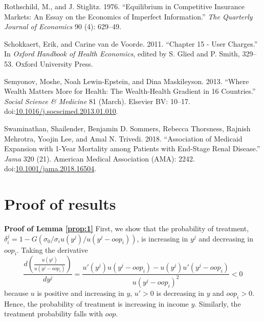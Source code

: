 \documentclass[a4paper,12pt]{article}
\begin{document}
\hypertarget{citeproc_bib_item_23}{Rothschild, M., and J. Stiglitz. 1976. “Equilibrium in Competitive Insurance Markets: An Essay on the Economics of Imperfect Information.” \textit{The Quarterly Journal of Economics} 90 (4): 629–49.}

\hypertarget{citeproc_bib_item_24}{Schokkaert, Erik, and Carine van de Voorde. 2011. “Chapter 15 - User Charges.” In \textit{Oxford Handbook of Health Economics}, edited by S. Glied and P. Smith, 329–53. Oxford University Press.}

\hypertarget{citeproc_bib_item_25}{Semyonov, Moshe, Noah Lewin-Epstein, and Dina Maskileyson. 2013. “Where Wealth Matters More for Health: The Wealth-Health Gradient in 16 Countries.” \textit{Social Science \& Medicine} 81 (March). Elsevier BV: 10–17. doi:\href{https://doi.org/10.1016/j.socscimed.2013.01.010}{10.1016/j.socscimed.2013.01.010}.}

\hypertarget{citeproc_bib_item_26}{Swaminathan, Shailender, Benjamin D. Sommers, Rebecca Thorsness, Rajnish Mehrotra, Yoojin Lee, and Amal N. Trivedi. 2018. “Association of Medicaid Expansion with 1-Year Mortality among Patients with End-Stage Renal Disease.” \textit{Jama} 320 (21). American Medical Association (AMA): 2242. doi:\href{https://doi.org/10.1001/jama.2018.16504}{10.1001/jama.2018.16504}.}



\newpage
\appendix

\section{Proof of results}
\label{sec:org589ac25}

\textbf{Proof of Lemma \ref{prop:1}}
First, we show that the probability of treatment, \(\delta_i^j = 1-G(\sigma_0/\sigma_i u(y^j)/u(y^j-oop_{i}))\), is increasing in \(y^j\) and decreasing in \(oop_{i}\). Taking the derivative
\begin{equation}
\label{eq:treatment_y}
\frac{d \left( \frac{u(y^{j})}{u(y^{j}-oop_{i})} \right)}{dy^j} = \frac{u'(y^{j})u(y^j-oop_{i}) - u(y^{j})u'(y^{j}-oop_{i})}{u(y^j-oop_{i})^2} < 0
\end{equation}
because \(u\) is positive and increasing in \(y\), \(u'>0\) is decreasing in \(y\) and \(oop_{i} >0\). Hence, the probability of treatment is increasing in income \(y\). Similarly, the treatment probability falls with \(oop\).
\end{document}

